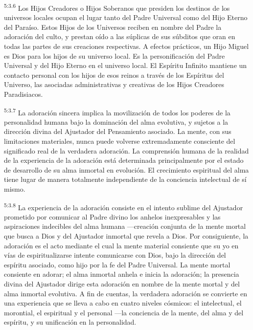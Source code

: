 \par
\textsuperscript{5:3.6} Los Hijos Creadores o Hijos Soberanos que presiden los destinos de los universos locales ocupan el lugar tanto del Padre Universal como del Hijo Eterno del Paraíso. Estos Hijos de los Universos reciben en nombre del Padre la adoración del culto, y prestan oído a las súplicas de sus súbditos que oran en todas las partes de sus creaciones respectivas. A efectos prácticos, un Hijo Miguel es Dios para los hijos de su universo local. Es la personificación del Padre Universal y del Hijo Eterno en el universo local. El Espíritu Infinito mantiene un contacto personal con los hijos de esos reinos a través de los Espíritus del Universo, las asociadas administrativas y creativas de los Hijos Creadores Paradisiacos.

\par
\textsuperscript{5:3.7} La adoración sincera implica la movilización de todos los poderes de la personalidad humana bajo la dominación del alma evolutiva, y sujetos a la dirección divina del Ajustador del Pensamiento asociado. La mente, con sus limitaciones materiales, nunca puede volverse extremadamente consciente del significado real de la verdadera adoración. La comprensión humana de la realidad de la experiencia de la adoración está determinada principalmente por el estado de desarrollo de su alma inmortal en evolución. El crecimiento espiritual del alma tiene lugar de manera totalmente independiente de la conciencia intelectual de sí mismo.

\par
\textsuperscript{5:3.8} La experiencia de la adoración consiste en el intento sublime del Ajustador prometido por comunicar al Padre divino los anhelos inexpresables y las aspiraciones indecibles del alma humana ---creación conjunta de la mente mortal que busca a Dios y del Ajustador inmortal que revela a Dios. Por consiguiente, la adoración es el acto mediante el cual la mente material consiente que su yo en vías de espiritualizarse intente comunicarse con Dios, bajo la dirección del espíritu asociado, como hijo por la fe del Padre Universal. La mente mortal consiente en adorar; el alma inmortal anhela e inicia la adoración; la presencia divina del Ajustador dirige esta adoración en nombre de la mente mortal y del alma inmortal evolutiva. A fin de cuentas, la verdadera adoración se convierte en una experiencia que se lleva a cabo en cuatro niveles cósmicos: el intelectual, el morontial, el espiritual y el personal ---la conciencia de la mente, del alma y del espíritu, y su unificación en la personalidad.

